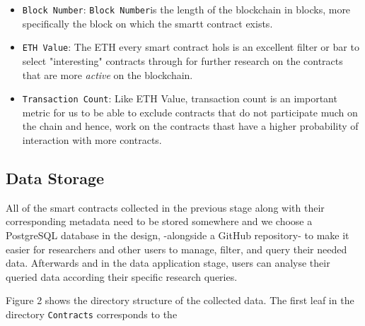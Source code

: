 \begin{itemize}
		\item{\verb|Block Number|: \verb|Block Number|is the length of the blockchain in blocks, more specifically the block on which the smartt contract exists.}\\
		\item \verb|ETH Value|: The ETH every smart contract hols is an excellent filter or bar to select "interesting" contracts through for further research on the contracts that are more \emph{active} on the blockchain.\\

		\item \verb|Transaction Count|: Like ETH Value, transaction count is an important metric for us to be able to exclude contracts that do not participate much on the chain and hence, work on the contracts thast have a higher probability of interaction with more contracts.\\
		\end{itemize}
	
	\subsection{Data Storage}
			All of the smart contracts collected in the previous stage along with their corresponding metadata need to be stored somewhere and we choose a PostgreSQL database in the design, -alongside a GitHub repository- to make it easier for researchers and other users to manage, filter, and query their needed data.
			Afterwards and in the data application stage, users can analyse their queried data according their specific research queries.

			Figure 2 shows the directory structure of the collected data. The first leaf in the directory \texttt{Contracts} corresponds to the \\



